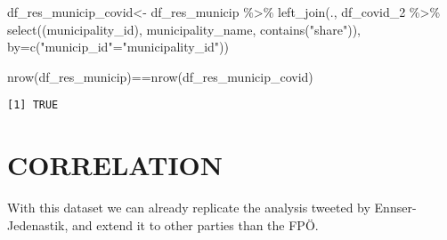 \documentclass[
  letterpaper,
  DIV=11,
  numbers=noendperiod,
  oneside]{scrartcl}
\newenvironment{Shaded}{\begin{snugshade}}{\end{snugshade}}
\newcommand{\AttributeTok}[1]{\textcolor[rgb]{0.40,0.45,0.13}{#1}}
\newcommand{\FunctionTok}[1]{\textcolor[rgb]{0.28,0.35,0.67}{#1}}
\newcommand{\NormalTok}[1]{\textcolor[rgb]{0.00,0.23,0.31}{#1}}
\newcommand{\OtherTok}[1]{\textcolor[rgb]{0.00,0.23,0.31}{#1}}
\newcommand{\SpecialCharTok}[1]{\textcolor[rgb]{0.37,0.37,0.37}{#1}}
\newcommand{\StringTok}[1]{\textcolor[rgb]{0.13,0.47,0.30}{#1}}
\begin{document}
\begin{Shaded}
\begin{Highlighting}[]
\NormalTok{df\_res\_municip\_covid}\OtherTok{\textless{}{-}}\NormalTok{ df\_res\_municip }\SpecialCharTok{\%\textgreater{}\%} 
  \FunctionTok{left\_join}\NormalTok{(., }
\NormalTok{            df\_covid\_2 }\SpecialCharTok{\%\textgreater{}\%} \FunctionTok{select}\NormalTok{((municipality\_id), municipality\_name, }\FunctionTok{contains}\NormalTok{(}\StringTok{"share"}\NormalTok{)),}
            \AttributeTok{by=}\FunctionTok{c}\NormalTok{(}\StringTok{"municip\_id"}\OtherTok{=}\StringTok{"municipality\_id"}\NormalTok{))}

\FunctionTok{nrow}\NormalTok{(df\_res\_municip)}\SpecialCharTok{==}\FunctionTok{nrow}\NormalTok{(df\_res\_municip\_covid)}
\end{Highlighting}
\end{Shaded}

\begin{verbatim}
[1] TRUE
\end{verbatim}

\hypertarget{correlation}{%
\section{CORRELATION}\label{correlation}}

With this dataset we can already replicate the analysis tweeted by
Ennser-Jedenastik, and extend it to other parties than the FPÖ.
\end{document}
